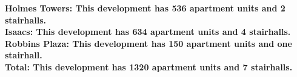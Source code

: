 \bf{Holmes Towers}: This development has 536 apartment units and 2 stairhalls.\\\bf{Isaacs}: This development has 634 apartment units and 4 stairhalls.\\\bf{Robbins Plaza}: This development has 150 apartment units and one stairhall.\\\bf{Total}: This development has 1320 apartment units and 7 stairhalls.\\